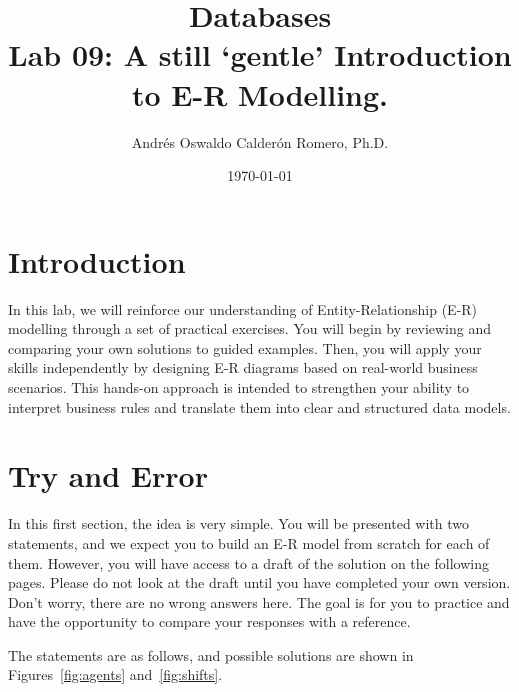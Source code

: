 \documentclass{article}
\title{Databases \\ Lab 09: A still `gentle' Introduction to E-R Modelling.}
\author{Andrés Oswaldo Calderón Romero, Ph.D.}
\date{\today}
\begin{document}
\maketitle

\section{Introduction}

In this lab, we will reinforce our understanding of Entity-Relationship (E-R) modelling through a set of practical exercises. You will begin by reviewing and comparing your own solutions to guided examples. Then, you will apply your skills independently by designing E-R diagrams based on real-world business scenarios. This hands-on approach is intended to strengthen your ability to interpret business rules and translate them into clear and structured data models.

\section{Try and Error} \label{sec:try}
In this first section, the idea is very simple. You will be presented with two statements, and we expect you to build an E-R model from scratch for each of them. However, you will have access to a draft of the solution on the following pages. Please do not look at the draft until you have completed your own version. Don’t worry, there are no wrong answers here. The goal is for you to practice and have the opportunity to compare your responses with a reference.

The statements are as follows, and possible solutions are shown in Figures~\ref{fig:agents} and~\ref{fig:shifts}.
\end{document}
